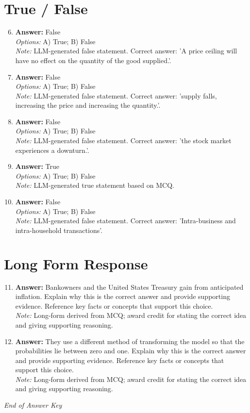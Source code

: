 \documentclass[12pt]{article}
\begin{document}
\section*{True / False}
\begin{enumerate}[label=\arabic*.]
\setcounter{enumi}{5}
\item \textbf{Answer:} False
\\ \textit{Options:} A) True; B) False
\\ \textit{Note:} LLM-generated false statement. Correct answer: 'A price ceiling will have no effect on the quantity of the good supplied.'.
\item \textbf{Answer:} False
\\ \textit{Options:} A) True; B) False
\\ \textit{Note:} LLM-generated false statement. Correct answer: 'supply falls, increasing the price and increasing the quantity.'.
\item \textbf{Answer:} False
\\ \textit{Options:} A) True; B) False
\\ \textit{Note:} LLM-generated false statement. Correct answer: 'the stock market experiences a downturn.'.
\item \textbf{Answer:} True
\\ \textit{Options:} A) True; B) False
\\ \textit{Note:} LLM-generated true statement based on MCQ.
\item \textbf{Answer:} False
\\ \textit{Options:} A) True; B) False
\\ \textit{Note:} LLM-generated false statement. Correct answer: 'Intra-business and intra-household transactions'.
\end{enumerate}

\section*{Long Form Response}
\begin{enumerate}[label=\arabic*.]
\setcounter{enumi}{10}
\item \textbf{Answer:} Bankowners and the United States Treasury gain from anticipated inflation. Explain why this is the correct answer and provide supporting evidence. Reference key facts or concepts that support this choice.
\\ \textit{Note:} Long-form derived from MCQ; award credit for stating the correct idea and giving supporting reasoning.
\item \textbf{Answer:} They use a different method of transforming the model so that the probabilities lie between zero and one. Explain why this is the correct answer and provide supporting evidence. Reference key facts or concepts that support this choice.
\\ \textit{Note:} Long-form derived from MCQ; award credit for stating the correct idea and giving supporting reasoning.
\end{enumerate}

\vfill
\noindent\textit{End of Answer Key}
\end{document}
